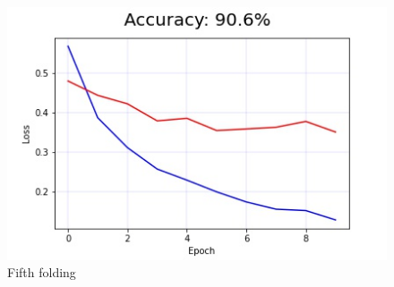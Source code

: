 \documentclass[11pt]{article}
\begin{document}
\begin{figure}[H]
    \centerline{\includegraphics[scale=.5]{image5.jpg}}
    \caption{Fifth folding}
    \label{fig}
\end{figure}

\printbibliography
\end{document}
